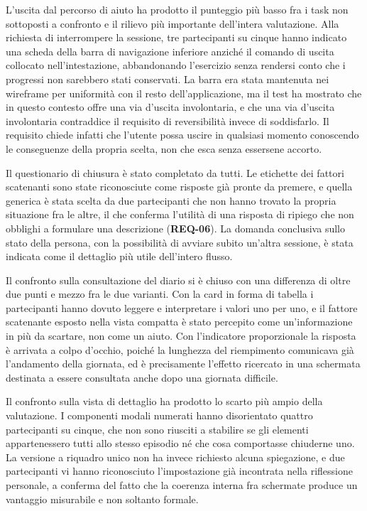 L'uscita dal percorso di aiuto ha prodotto il punteggio più basso fra i task non sottoposti a confronto e il rilievo più importante dell'intera valutazione.
Alla richiesta di interrompere la sessione, tre partecipanti su cinque hanno indicato una scheda della barra di navigazione inferiore anziché il comando di uscita collocato nell'intestazione, abbandonando l'esercizio senza rendersi conto che i progressi non sarebbero stati conservati.
La barra era stata mantenuta nei wireframe per uniformità con il resto dell'applicazione, ma il test ha mostrato che in questo contesto offre una via d'uscita involontaria, e che una via d'uscita involontaria contraddice il requisito di reversibilità invece di soddisfarlo.
Il requisito chiede infatti che l'utente possa uscire in qualsiasi momento conoscendo le conseguenze della propria scelta, non che esca senza essersene accorto.

Il questionario di chiusura è stato completato da tutti.
Le etichette dei fattori scatenanti sono state riconosciute come risposte già pronte da premere, e quella generica è stata scelta da due partecipanti che non hanno trovato la propria situazione fra le altre, il che conferma l'utilità di una risposta di ripiego che non obblighi a formulare una descrizione (\textbf{REQ-06}).
La domanda conclusiva sullo stato della persona, con la possibilità di avviare subito un'altra sessione, è stata indicata come il dettaglio più utile dell'intero flusso.

Il confronto sulla consultazione del diario si è chiuso con una differenza di oltre due punti e mezzo fra le due varianti.
Con la card in forma di tabella i partecipanti hanno dovuto leggere e interpretare i valori uno per uno, e il fattore scatenante esposto nella vista compatta è stato percepito come un'informazione in più da scartare, non come un aiuto.
Con l'indicatore proporzionale la risposta è arrivata a colpo d'occhio, poiché la lunghezza del riempimento comunicava già l'andamento della giornata, ed è precisamente l'effetto ricercato in una schermata destinata a essere consultata anche dopo una giornata difficile.

Il confronto sulla vista di dettaglio ha prodotto lo scarto più ampio della valutazione.
I componenti modali numerati hanno disorientato quattro partecipanti su cinque, che non sono riusciti a stabilire se gli elementi appartenessero tutti allo stesso episodio né che cosa comportasse chiuderne uno.
La versione a riquadro unico non ha invece richiesto alcuna spiegazione, e due partecipanti vi hanno riconosciuto l'impostazione già incontrata nella riflessione personale, a conferma del fatto che la coerenza interna fra schermate produce un vantaggio misurabile e non soltanto formale.

